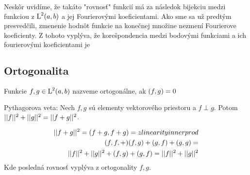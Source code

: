 \begin{poznamka}
    Neskôr uvidíme, že takáto "rovnosť" funkcií má za následok
    bijekciu medzi funkciou z $\mbox{L}^2(a,b)$ a jej Fourierovými
    koeficientami. Ako sme sa už predtým presvedčili, zmenenie hodnôt
    funkcie na konečnej množine nezmení Fourierove koeficienty.
    Z tohoto vyplýva, že korešpondencia medzi bodovými funkciami a ich
    fourierovými koeficientami je 
\end{poznamka}


\subsection{Ortogonalita}
\begin{definicia}
 Funkcie $f,g \in \mbox{L}^2(a,b)$ nazveme ortogonálne, ak
 $( f,g )=0$
\end{definicia}


\begin{lema}
    Pythagorova veta:
    Nech $f,g$ sú elementy vektorového priestoru a
    $f\perp g$.
    Potom $||f||^2 + ||g||^2 = ||f+g||^2$.
\end{lema}
\begin{dokaz}
    \begin{align}
        ||f+g||^2 = ( f+g,f+g ) =  z linearity inner prod\\
        ( f,f,+ ) ( f,g ) + ( g,f ) + ( g,g ) = \\
        ||f||^2 + ||g||^2 + ( f,g ) + ( g,f ) = 
        ||f||^2 + ||g||^2
    \end{align}
    Kde posledná rovnosť vyplýva z ortogonality $f,g$.
\end{dokaz}

